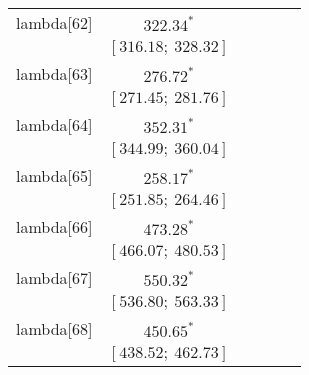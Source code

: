 \begin{table}
\begin{center}
\begin{tabular}{l c c c c c }
lambda[62]  & $322.34^{*}$                     &                           &                           &                         &                         \\
            & $[316.18;\ 328.32]$              &                           &                           &                         &                         \\
lambda[63]  & $276.72^{*}$                     &                           &                           &                         &                         \\
            & $[271.45;\ 281.76]$              &                           &                           &                         &                         \\
lambda[64]  & $352.31^{*}$                     &                           &                           &                         &                         \\
            & $[344.99;\ 360.04]$              &                           &                           &                         &                         \\
lambda[65]  & $258.17^{*}$                     &                           &                           &                         &                         \\
            & $[251.85;\ 264.46]$              &                           &                           &                         &                         \\
lambda[66]  & $473.28^{*}$                     &                           &                           &                         &                         \\
            & $[466.07;\ 480.53]$              &                           &                           &                         &                         \\
lambda[67]  & $550.32^{*}$                     &                           &                           &                         &                         \\
            & $[536.80;\ 563.33]$              &                           &                           &                         &                         \\
lambda[68]  & $450.65^{*}$                     &                           &                           &                         &                         \\
            & $[438.52;\ 462.73]$              &                           &                           &                         &                         \\

\end{tabular}
\end{center}
\end{table}
